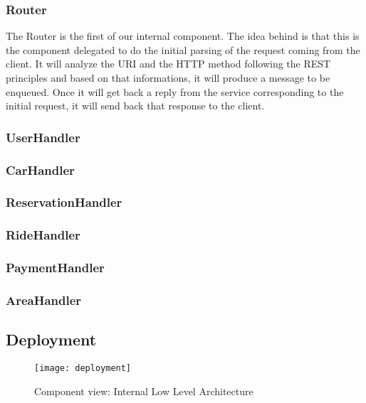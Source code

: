 \pagebreak
\subsubsection{Router}
The Router is the first of our internal component. The idea behind is that this is the component
delegated to do the initial parsing of the request coming from the client. It will analyze
the URI and the HTTP method following the REST principles and based on that informations,
it will produce a message to be enqueued. Once it will get back a reply from the service
corresponding to the initial request, it will send back that response to the client.

\subsubsection{UserHandler}
\subsubsection{CarHandler}
\subsubsection{ReservationHandler}
\subsubsection{RideHandler}
\subsubsection{PaymentHandler}
\subsubsection{AreaHandler}

\subsection{Deployment}
\begin{sidewaysfigure}
\centering
\texttt{[image: deployment]}
\caption{Component view: Internal Low Level Architecture}
\label{fig:depl}
\end{sidewaysfigure}
